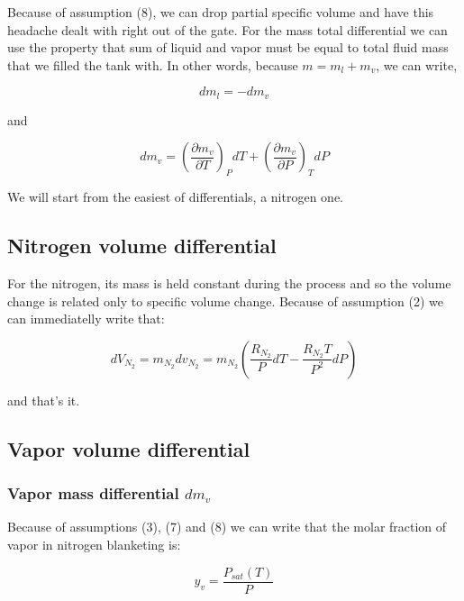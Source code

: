 \documentclass[10pt, letterpaper]{article}
\begin{document}
	Because of assumption (8), we can drop partial specific volume and have this headache dealt with right out of the gate.
	For the mass total differential we can use the property that sum of liquid and vapor must be equal to total fluid mass that we filled the tank with. In other words, because $m = m_{l} + m_{v}$, we can write,

	\begin{equation*}
		dm_{l} = -dm_{v}
	\end{equation*}

	and

	\begin{equation*}
		dm_{v} = \left( \frac{\partial{m_{v}}}{\partial{T}} \right)_{P} dT +
		\left( \frac{\partial{m_{v}}}{\partial{P}} \right)_{T} dP
	\end{equation*}

	We will start from the easiest of differentials, a nitrogen one.

	\subsection{Nitrogen volume differential}
	\label{sec:nitrogen}

	For the nitrogen, its mass is held constant during the process and so the volume change is related only to specific volume change.
	Because of assumption (2) we can immediatelly write that:

	\begin{equation*}
		dV_{N_{2}} = m_{N_{2}} dv_{N_{2}} =
		m_{N_{2}} \left( \frac{R_{N_{2}}}{P} dT - \frac{R_{N_{2}} T}{P^{2}} dP \right)
	\end{equation*}

	and that's it.

	\subsection{Vapor volume differential}
	\label{sec:dVv}

	\subsubsection{Vapor mass differential $dm_{v}$}
	\label{sec:dmv}

	Because of assumptions (3), (7) and (8) we can write that the molar fraction of vapor in nitrogen blanketing is:

	\begin{equation*}
		y_{v} = \frac{P_{sat}(T)}{P}
	\end{equation*}
\end{document}
